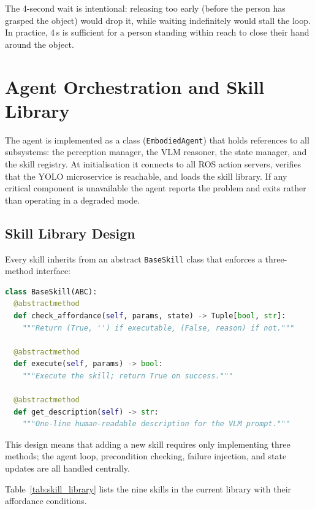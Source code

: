 The 4-second wait is intentional: releasing too early (before the person has
grasped the object) would drop it, while waiting indefinitely would stall
the loop.
In practice, 4\,s is sufficient for a person standing within reach to close
their hand around the object.

\section{Agent Orchestration and Skill Library}
\label{sec:agent}

The agent is implemented as a class (\texttt{EmbodiedAgent}) that holds
references to all subsystems: the perception manager, the VLM reasoner, the
state manager, and the skill registry.
At initialisation it connects to all ROS action servers, verifies that the
YOLO microservice is reachable, and loads the skill library.
If any critical component is unavailable the agent reports the problem and
exits rather than operating in a degraded mode.

\subsection{Skill Library Design}

Every skill inherits from an abstract \texttt{BaseSkill} class that enforces
a three-method interface:

\begin{lstlisting}[language=Python, numbers=none,
    caption={Abstract base class for all skills.}]
class BaseSkill(ABC):
  @abstractmethod
  def check_affordance(self, params, state) -> Tuple[bool, str]:
    """Return (True, '') if executable, (False, reason) if not."""

  @abstractmethod
  def execute(self, params) -> bool:
    """Execute the skill; return True on success."""

  @abstractmethod
  def get_description(self) -> str:
    """One-line human-readable description for the VLM prompt."""
\end{lstlisting}

This design means that adding a new skill requires only implementing three
methods; the agent loop, precondition checking, failure injection, and
state updates are all handled centrally.

Table~\ref{tab:skill_library} lists the nine skills in the current library
with their affordance conditions.

